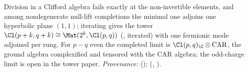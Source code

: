 Division in a Clifford algebra fails exactly at the non-invertible elements, and among nondegenerate null-lift completions the minimal one adjoins one hyperbolic plane $(1,1)$; iterating gives the tower $\Cl(p+k, q+k) \cong \Mat(2^{k}, \Cl(p,q))$ (, iterated) with one fermionic mode adjoined per rung. For $p - q$ even the completed limit is $\Cl(p,q)_{\C} \otimes \mathrm{CAR}$, the ground algebra complexified and tensored with the CAR algebra; the odd-charge limit is open in the tower paper. \emph{Provenance:} \cite[Thm.~4.13]{ButlerT1} (); \cite[Thm.~5.6, Question~5.8, Cor.~6.2]{ButlerT3} (, ).
